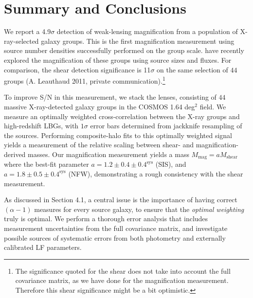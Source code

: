 \documentclass[iop]{emulateapj}
\begin{document}

\section{Summary and Conclusions}
\label{summary}
We report a 4.9$\sigma$ detection of weak-lensing magnification from a population of X-ray-selected galaxy groups. This is the first magnification measurement using source number densities successfully performed on the group scale. \citet{Schmidt12} have recently explored the magnification of these groups using source sizes and fluxes. For comparison, the shear detection significance is 11$\sigma$ on the same selection of $44$ groups (A. Leauthaud 2011, private communication).\footnote[1]{The significance quoted for the shear does not take into account the full covariance matrix, as we have done for the magnification measurement. Therefore this shear significance might be a bit optimistic.}

To improve S/N in this measurement, we stack the lenses, consisting of $44$ massive X-ray-detected galaxy groups in the COSMOS 1.64 deg$^2$ field. We measure an optimally weighted cross-correlation between the X-ray groups and high-redshift LBGs, with $1 \sigma$ error bars determined from jackknife resampling of the sources. Performing composite-halo fits to this optimally weighted signal yields a measurement of the relative scaling between shear- and magnification-derived masses. Our magnification measurement yields a mass $M_{\text{mag}}=aM_{\text{shear}}$ where the best-fit parameter $a= 1.2 \pm 0.4 \pm 0.4^{\text{sys}}$ (SIS), and $a= 1.8 \pm 0.5 \pm 0.4^{\text{sys}}$ (NFW), demonstrating a rough consistency with the shear measurement.

As discussed in Section 4.1, a central issue is the importance of having correct $(\alpha-1)$ measures for every source galaxy, to ensure that the {\it optimal weighting} truly is optimal. We perform a thorough error analysis that includes measurement uncertainties from the full covariance matrix, and investigate possible sources of systematic errors from both photometry and externally calibrated LF parameters.
\end{document}
